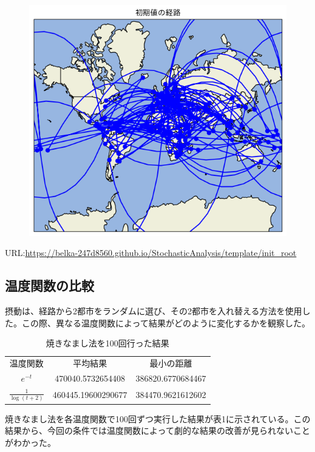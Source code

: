 \documentclass[a4paper,11pt]{ltjsarticle}
\begin{document}
\begin{figure}[H]
    \begin{center}
        \includegraphics[scale=0.7]{img/init_root.png}
    \end{center}
\end{figure}
URL:\url{https://belka-247d8560.github.io/StochasticAnalysis/template/init_root}

\subsection{温度関数の比較}
摂動は、経路から2都市をランダムに選び、その2都市を入れ替える方法を使用した。この際、異なる温度関数によって結果がどのように変化するかを観察した。\\
\begin{table}[H]
    \centering
    \caption{焼きなまし法を100回行った結果}
    \label{tab:hogehoge}
    \begin{tabular}{ccc}
        温度関数 & 平均結果 & 最小の距離\\
        $e^{-t}$ & 470040.5732654408 & 386820.6770684467\\
        $\frac{1}{\log{(t+2)}}$ & 460445.19600290677 & 384470.9621612602
    \end{tabular}
\end{table}
焼きなまし法を各温度関数で100回ずつ実行した結果が表1に示されている。この結果から、今回の条件では温度関数によって劇的な結果の改善が見られないことがわかった。
\end{document}
